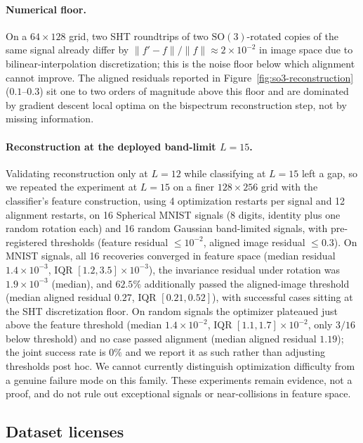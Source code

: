 \documentclass{article}
\theoremstyle{definition}
\theoremstyle{remark}
\newcommand{\SO}{\mathrm{SO}}
\theoremstyle{definition}
\begin{document}
\paragraph{Numerical floor.}
On a $64{\times}128$ grid, two SHT roundtrips of two $\SO(3)$-rotated
copies of the same signal already differ by
$\|f' - f\|/\|f\|\approx 2\times 10^{-2}$ in image space due to
bilinear-interpolation discretization; this is the noise floor below
which alignment cannot improve. The aligned residuals reported in
Figure~\ref{fig:so3-reconstruction} ($0.1$--$0.3$) sit one to two
orders of magnitude above this floor and are dominated by gradient
descent local optima on the bispectrum reconstruction step, not by
missing information.

\paragraph{Reconstruction at the deployed band-limit $L{=}15$.}
Validating reconstruction only at $L{=}12$ while classifying at
$L{=}15$ left a gap, so we repeated the experiment at $L = 15$ on a
finer $128{\times}256$ grid with the classifier's feature
construction, using 4 optimization restarts per signal and 12
alignment restarts, on 16 Spherical MNIST signals (8 digits, identity
plus one random rotation each) and 16 random Gaussian band-limited
signals, with pre-registered thresholds (feature residual
$\le 10^{-2}$, aligned image residual $\le 0.3$). On MNIST signals,
all 16 recoveries converged in feature space (median residual
$1.4\times10^{-3}$, IQR $[1.2, 3.5]\times10^{-3}$), the invariance
residual under rotation was $1.9\times10^{-3}$ (median), and $62.5\%$
additionally passed the aligned-image threshold (median aligned
residual $0.27$, IQR $[0.21, 0.52]$), with successful cases sitting
at the SHT discretization floor. On random signals the optimizer
plateaued just above the feature threshold (median
$1.4\times10^{-2}$, IQR $[1.1, 1.7]\times10^{-2}$, only $3/16$ below
threshold) and no case passed alignment (median aligned residual
$1.19$); the joint success rate is $0\%$ and we report it as such
rather than adjusting thresholds post hoc. We cannot currently
distinguish optimization difficulty from a genuine failure mode on
this family. These experiments remain evidence, not a proof, and do
not rule out exceptional signals or near-collisions in feature
space.

\subsection{Dataset licenses}
\end{document}
